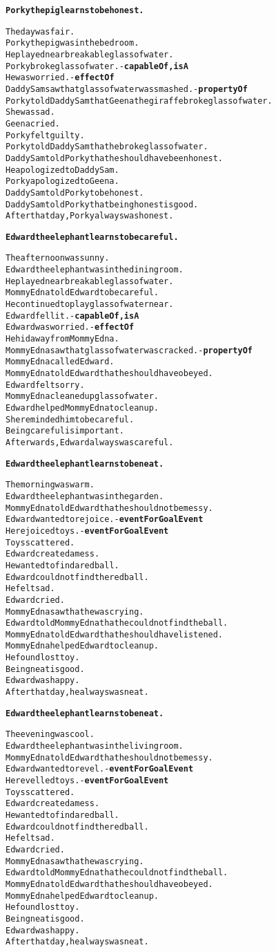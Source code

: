 \begin{alltt}
\textbf{Porky the pig learns to be honest.}

The day was fair.
Porky the pig was in the bedroom.
He played near breakable glass of water.
Porky broke glass of water. - \textbf{capableOf, isA}
He was worried. - \textbf{effectOf}
Daddy Sam saw that glass of water was smashed. - \textbf{propertyOf}
Porky told Daddy Sam that Geena the giraffe broke glass of water.
She was sad.
Geena cried.
Porky felt guilty.
Porky told Daddy Sam that he broke glass of water.
Daddy Sam told Porky that he should have been honest.
He apologized to Daddy Sam.
Porky apologized to Geena.
Daddy Sam told Porky to be honest.
Daddy Sam told Porky that being honest is good.
After that day, Porky always was honest.
\end{alltt}

\begin{alltt}
\textbf{Edward the elephant learns to be careful.}

The afternoon was sunny.
Edward the elephant was in the dining room.
He played near breakable glass of water.
Mommy Edna told Edward to be careful.
He continued to play glass of water near.
Edward fell it. - \textbf{capableOf, isA}
Edward was worried. - \textbf{effectOf}
He hid away from Mommy Edna.
Mommy Edna saw that glass of water was cracked. - \textbf{propertyOf}
Mommy Edna called Edward.
Mommy Edna told Edward that he should have obeyed.
Edward felt sorry.
Mommy Edna cleaned up glass of water.
Edward helped Mommy Edna to clean up.
She reminded him to be careful.
Being careful is important.
Afterwards, Edward always was careful.
\end{alltt}

\begin{alltt}
\textbf{Edward the elephant learns to be neat.}

The morning was warm.
Edward the elephant was in the garden.
Mommy Edna told Edward that he should not be messy.
Edward wanted to rejoice. - \textbf{eventForGoalEvent}
He rejoiced toys. - \textbf{eventForGoalEvent}
Toys scattered.
Edward created a mess.
He wanted to find a red ball.
Edward could not find the red ball.
He felt sad.
Edward cried.
Mommy Edna saw that he was crying.
Edward told Mommy Edna that he could not find the ball.
Mommy Edna told Edward that he should have listened.
Mommy Edna helped Edward to clean up.
He found lost toy.
Being neat is good.
Edward was happy.
After that day, he always was neat.

\textbf{Edward the elephant learns to be neat.}

The evening was cool.
Edward the elephant was in the living room.
Mommy Edna told Edward that he should not be messy.
Edward wanted to revel. - \textbf{eventForGoalEvent}
He revelled toys. - \textbf{eventForGoalEvent}
Toys scattered.
Edward created a mess.
He wanted to find a red ball.
Edward could not find the red ball.
He felt sad.
Edward cried.
Mommy Edna saw that he was crying.
Edward told Mommy Edna that he could not find the ball.
Mommy Edna told Edward that he should have obeyed.
Mommy Edna helped Edward to clean up.
He found lost toy.
Being neat is good.
Edward was happy.
After that day, he always was neat.
\end{alltt}

